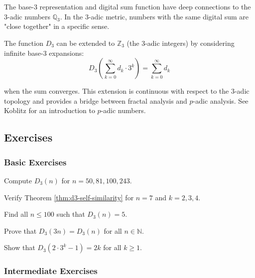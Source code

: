 \begin{advanced}
The base-3 representation and digital sum function have deep connections to the 3-adic numbers $\mathbb{Q}_3$. In the 3-adic metric, numbers with the same digital sum are "close together" in a specific sense.

The function $D_3$ can be extended to $\mathbb{Z}_3$ (the 3-adic integers) by considering infinite base-3 expansions:
$$D_3\left(\sum_{k=0}^{\infty} d_k \cdot 3^k\right) = \sum_{k=0}^{\infty} d_k$$

when the sum converges. This extension is continuous with respect to the 3-adic topology and provides a bridge between fractal analysis and $p$-adic analysis. See Koblitz \cite{koblitz1984} for an introduction to $p$-adic numbers.
\end{advanced}

\subsection{Exercises}
\label{subsec:exercises-1-2}

\subsubsection*{Basic Exercises}

\begin{exercise}[1.2.1]
Compute $D_3(n)$ for $n = 50, 81, 100, 243$.
\end{exercise}

\begin{exercise}[1.2.2]
Verify Theorem \ref{thm:d3-self-similarity} for $n = 7$ and $k = 2, 3, 4$.
\end{exercise}

\begin{exercise}[1.2.3]
Find all $n \leq 100$ such that $D_3(n) = 5$.
\end{exercise}

\begin{exercise}[1.2.4]
Prove that $D_3(3n) = D_3(n)$ for all $n \in \mathbb{N}$.
\end{exercise}

\begin{exercise}[1.2.5]
Show that $D_3(2 \cdot 3^k - 1) = 2k$ for all $k \geq 1$.
\end{exercise}

\subsubsection*{Intermediate Exercises}

